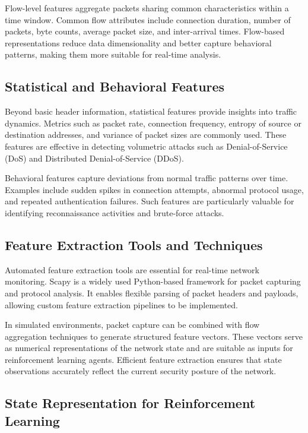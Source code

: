 \documentclass[12pt,a4paper]{report}
\begin{document}
Flow-level features aggregate packets sharing common characteristics within a time window.
Common flow attributes include connection duration, number of packets, byte counts, average packet size, and inter-arrival times.
Flow-based representations reduce data dimensionality and better capture behavioral patterns, making them more suitable for real-time analysis.

\subsection{Statistical and Behavioral Features}

Beyond basic header information, statistical features provide insights into traffic dynamics.
Metrics such as packet rate, connection frequency, entropy of source or destination addresses, and variance of packet sizes are commonly used.
These features are effective in detecting volumetric attacks such as Denial-of-Service (DoS) and Distributed Denial-of-Service (DDoS).

Behavioral features capture deviations from normal traffic patterns over time.
Examples include sudden spikes in connection attempts, abnormal protocol usage, and repeated authentication failures.
Such features are particularly valuable for identifying reconnaissance activities and brute-force attacks.

\subsection{Feature Extraction Tools and Techniques}

Automated feature extraction tools are essential for real-time network monitoring.
Scapy is a widely used Python-based framework for packet capturing and protocol analysis.
It enables flexible parsing of packet headers and payloads, allowing custom feature extraction pipelines to be implemented.

In simulated environments, packet capture can be combined with flow aggregation techniques to generate structured feature vectors.
These vectors serve as numerical representations of the network state and are suitable as inputs for reinforcement learning agents.
Efficient feature extraction ensures that state observations accurately reflect the current security posture of the network.

\subsection{State Representation for Reinforcement Learning}
\end{document}
